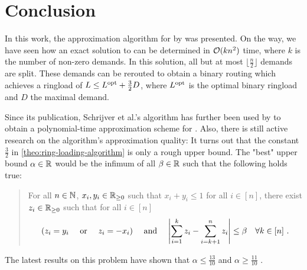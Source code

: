 \section{Conclusion}

In this work, the approximation algorithm for \RL by \citet{schrijver99} was presented.
On the way, we have seen how an exact solution to \RRL can be determined in $\mathcal{O}(k n^2)$ time, where $k$ is the number of non-zero demands.
In this solution, all but at most $\lfloor \frac{n}{2} \rfloor$ demands are split.
These demands can be rerouted to obtain a binary routing which achieves a ringload of $L \leq L^{\mathrm{opt}} + \frac{3}{2}D$, where $L^{\mathrm{opt}}$ is the optimal binary ringload and $D$ the maximal demand.

Since its publication, Schrijver et al.'s  algorithm has further been used by \citet{khanna97} to obtain a polynomial-time approximation scheme for \RL.
Also, there is still active research on the algorithm's approximation quality:
It turns out that the constant $\frac{3}{2}$ in \cref{theo:ring-loading-algorithm} is only a rough upper bound.
The "best" upper bound $\alpha \in \mathbb{R}$ would be the infimum of all $\beta \in \mathbb{R}$ such that the following holds true:
\begin{quote}
	For all $n \in \mathbb{N}$, $x_i, y_i \in \mathbb{R}_{\geq 0}$ such that $x_i + y_i \leq 1$ for all $i \in [n]$, there exist $z_i \in \mathbb{R}_{\geq 0}$ such that for all $i \in [n]$
	\begin{equation}
		(z_i = y_i \quad \text{ or } \quad z_i = -x_i) 
		\quad \text{ and } \quad \abs{\sum_{i=1}^k z_i - \sum_{i = k+1}^n z_i} \leq \beta \quad \forall k \in [n] \ .
	\end{equation}
\end{quote}
The latest results on this problem have shown that $\alpha \leq \frac{13}{10}$ and $\alpha \geq \frac{11}{10}$ \cite{skutella16, daubel19}.